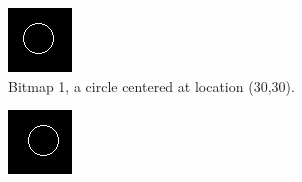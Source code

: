 \documentclass[12pt]{article}
\begin{document}
\begin{figure}
\centering
\begin{subfigure}[b]{.3\linewidth}
\includegraphics[width=\linewidth]{circle-left.png}
\caption{Bitmap 1, a circle centered at location (30,30).}
\label{fig:circle-left}
\end{subfigure}
\hspace{2mm}
\begin{subfigure}[b]{.3\linewidth}
\includegraphics[width=\linewidth]{circle-right.png}

\end{subfigure}
\end{figure}
\end{document}

